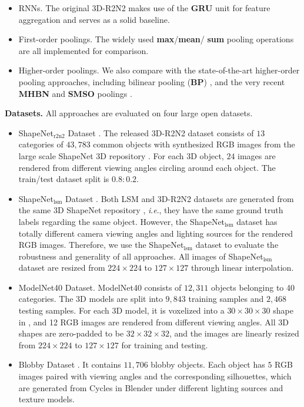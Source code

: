 \documentclass[twocolumn]{svjour3}    \pdfoutput=1
\newcommand{\ie}{\textit{i}.\textit{e}., }
\begin{document}
\begin{itemize}[leftmargin=0.3cm]
\item RNNs. The original 3D-R2N2 makes use of the \textbf{GRU} \citep{Chan2016,Kar2017} unit for feature aggregation and serves as a solid baseline.
\item First-order poolings. The widely used \textbf{max}/\textbf{mean}/ \textbf{sum} pooling operations \citep{Huang2018,Paschalidou2018,Eslami2018} are all implemented for comparison.
\item Higher-order poolings. We also compare with the state-of-the-art higher-order pooling approaches, including bilinear pooling (\textbf{BP}) \citep{Lin2015}, and the very recent \textbf{MHBN} \citep{Yu2018a} and \textbf{SMSO} poolings \citep{Yu2018b}. 
\end{itemize}

\textbf{Datasets.} All approaches are evaluated on four large open datasets.
\begin{itemize} [leftmargin=0.3cm]
\item ShapeNet$_{\textrm{r2n2}}$ Dataset \citep{Chan2016}. The released 3D-R2N2 dataset consists of $13$ categories of $43,783$ common objects with synthesized RGB images from the large scale ShapeNet 3D repository \citep{Chang2015}. For each 3D object, $24$ images are rendered from different viewing angles circling around each object. The train/test dataset split is $0.8:0.2$.
\item ShapeNet$_{\textrm{lsm}}$ Dataset \citep{Kar2017}. Both LSM and 3D-R2N2 datasets are generated from the same 3D ShapeNet repository \citep{Chang2015}, \ie they have the same ground truth labels regarding the same object. However, the ShapeNet$_{\textrm{lsm}}$ dataset has totally different camera viewing angles and lighting sources for the rendered RGB images. Therefore, we use the ShapeNet$_{\textrm{lsm}}$ dataset to evaluate the robustness and generality of all approaches. All images of ShapeNet$_{\textrm{lsm}}$ dataset are resized from $224\times 224$ to $127\times 127$ through linear interpolation.
\item ModelNet40 Dataset. ModelNet40 \citep{Wu2015} consists of $12,311$ objects belonging to 40 categories. The 3D models are split into $9,843$ training samples and $2,468$ testing samples. For each 3D model, it is voxelized into a $30\times30\times30$ shape in \citep{Qi2016a}, and 12 RGB images are rendered from different viewing angles. All 3D shapes are zero-padded to be $32\times32\times32$, and the images are linearly resized from $224\times224$ to $127\times127$ for training and testing.
\item Blobby Dataset \citep{Wiles2017}. It contains $11,706$ blobby objects. Each object has $5$ RGB images paired with viewing angles and the corresponding silhouettes, which are generated from Cycles in Blender under different lighting sources and texture models. 
\end{itemize}
\end{document}
